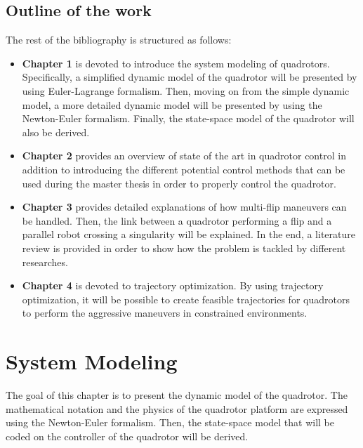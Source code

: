 \documentclass{thesisreport}
\begin{document}

\pagebreak

\section*{Outline of the work}

The rest of the bibliography is structured as follows:


\begin{itemize}
\setlength{\itemindent}{-.5in}
	\item [] \textbf{Chapter 1} is devoted to introduce the system modeling of quadrotors. Specifically, a simplified dynamic model of the quadrotor will be presented by using Euler-Lagrange formalism. Then, moving on from the simple dynamic model, a more detailed dynamic model will be presented by using the Newton-Euler formalism. Finally, the state-space model of the quadrotor will also be derived.

	\item [] \textbf{Chapter 2} provides an overview of state of the art in quadrotor control in addition to introducing the different potential control methods that can be used during the master thesis in order to properly control the quadrotor. 

	\item [] \textbf{Chapter 3} provides detailed explanations of how multi-flip maneuvers can be handled. Then, the link between a quadrotor performing a flip and a parallel robot crossing a singularity will be explained. In the end, a literature review is provided in order to show how the problem is tackled by different researches.

	\item [] \textbf{Chapter 4} is devoted to trajectory optimization. By using trajectory optimization, it will be possible to create feasible trajectories for quadrotors to perform the aggressive maneuvers in constrained environments.
	
\end{itemize}

\newpage

\chapter{System Modeling}
The goal of this chapter is to present the dynamic model of the quadrotor. The mathematical notation and the physics of the quadrotor platform are expressed using the Newton-Euler formalism. Then, the state-space model that will be coded on the controller of the quadrotor will be derived.
\end{document}
